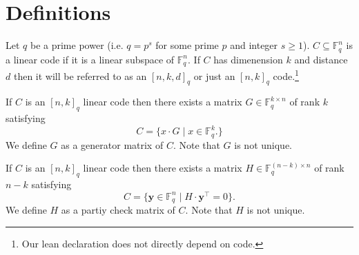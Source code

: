 \section{Definitions}
\begin{definition}
\label{def:LC_subspace}
\leanok
{}
Let $q$ be a prime power (i.e. $q = p^{s}$ for some prime $p$ and integer $s \geq 1$).
$C \subseteq \mathbb{F}^{n}_{q}$ is a linear code if it is a linear subspace of $\mathbb{F}^{n}_{q}$.
If $C$ has dimenension $k$ and distance $d$ then it will be referred to as an $[n,k,d]_{q}$ or just an $[n,k]_{q}$ code.\footnote{Our lean declaration does not directly depend on code.}
\end{definition}

\begin{definition}
\label{def:GeneratorMatrix}
\leanok
{}
If $C$ is an $[n, k]_{q}$ linear code then there exists a matrix $G \in \mathbb{F}^{k \times n}_{q}$ of rank $k$ satisfying
\[C = \{x \cdot G \mid x \in \mathbb{F}^{k}_{q}.\}\]
We define $G$ as a generator matrix of $C$.
Note that $G$ is not unique.
\end{definition}

\begin{definition}
\label{def:ParityCheckMatrix}
\leanok
{}
If $C$ is an $[n, k]_{q}$ linear code then there exists a matrix $H \in \mathbb{F}^{(n-k) \times n}_{q}$ of rank $n - k$ satisfying
\[C = \{\mathbf{y} \in \mathbb{F}^{n}_{q} \mid H \cdot \mathbf{y}^{\intercal} = 0\}.\]
We define $H$ as a partiy check matrix of $C$.
Note that $H$ is not unique.
\end{definition}
